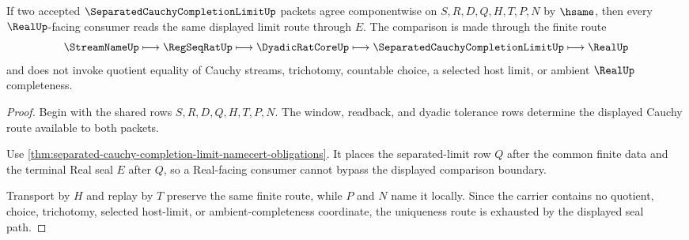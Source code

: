 \begin{theorem}
\label{thm:separated-cauchy-completion-limit-uniqueness-route}
If two accepted $\SeparatedCauchyCompletionLimitUp$ packets agree componentwise on $S,R,D,Q,H,T,P,N$ by $\hsame$, then every $\RealUp$-facing consumer reads the same displayed limit route through $E$. The comparison is made through the finite route
$$
\StreamNameUp \longmapsto \RegSeqRatUp \longmapsto \DyadicRatCoreUp \longmapsto \SeparatedCauchyCompletionLimitUp \longmapsto \RealUp
$$
and does not invoke quotient equality of Cauchy streams, trichotomy, countable choice, a selected host limit, or ambient $\RealUp$ completeness.
\end{theorem}
\begin{proof}
Begin with the shared rows $S,R,D,Q,H,T,P,N$. The window, readback, and dyadic tolerance rows determine the displayed Cauchy route available to both packets.

Use \autoref{thm:separated-cauchy-completion-limit-namecert-obligations}. It places the separated-limit row $Q$ after the common finite data and the terminal Real seal $E$ after $Q$, so a Real-facing consumer cannot bypass the displayed comparison boundary.

Transport by $H$ and replay by $T$ preserve the same finite route, while $P$ and $N$ name it locally. Since the carrier contains no quotient, choice, trichotomy, selected host-limit, or ambient-completeness coordinate, the uniqueness route is exhausted by the displayed seal path.
\end{proof}




